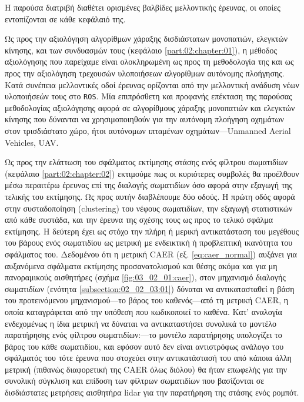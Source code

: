 Η παρούσα διατριβή διαθέτει ορισμένες βαλβίδες μελλοντικής έρευνας, οι οποίες
εντοπίζονται σε κάθε κεφάλαιό της.

Ως προς την αξιολόγηση αλγορίθμων χάραξης δισδιάστατων μονοπατιών, ελεγκτών
κίνησης, και των συνδυασμών τους (κεφάλαιο \ref{part:02:chapter:01}), η μέθοδος
αξιολόγησης που παρείχαμε είναι ολοκληρωμένη ως προς τη μεθοδολογία της και ως
προς την αξιολόγηση τρεχουσών υλοποιήσεων αλγορίθμων αυτόνομης πλοήγησης. Κατά
συνέπεια μελλοντικές οδοί έρευνας ορίζονται από την μελλοντική ανάδυση νέων
υλοποιήσεών τους στο \texttt{ROS}. Μία επιπρόσθετη και προφανής επέκταση της
παρούσας μεθοδολογίας αξιολόγησης αφορά σε αλγορίθμους χάραξης μονοπατιών και
ελεγκτών κίνησης που δύνανται να χρησιμοποιηθούν για την αυτόνομη πλοήγηση
οχημάτων στον τρισδιάστατο χώρο, ήτοι αυτόνομων ιπταμένων οχημάτων---Unmanned
Aerial Vehicles, UAV.

Ως προς την ελάττωση του σφάλματος εκτίμησης στάσης ενός φίλτρου σωματιδίων
(κεφάλαιο \ref{part:02:chapter:02}) εκτιμούμε πως οι κυριότερες συμβολές θα
προέλθουν μέσω περαιτέρω έρευνας επί της διαλογής σωματιδίων όσο αφορά στην
εξαγωγή της τελικής του εκτίμησης. Ως προς αυτήν διαβλέπουμε δύο οδούς. Η πρώτη
οδός αφορά στην συσταδοποίηση (clustering) του νέφους σωματιδίων, την εξαγωγή
στατιστικών από κάθε συστάδα, και την έρευνα της σχέσης τους ως προς το τελικό
σφάλμα εκτίμησης.  Η δεύτερη έχει ως στόχο την πλήρη ή μερική αντικατάσταση του
μεγέθους του βάρους ενός σωματιδίου ως μετρική με ενδεικτική ή προβλεπτική
ικανότητα του σφάλματος του.  Δεδομένου ότι η μετρική CAER (εξ.
\ref{eq:caer_normal}) αυξάνει για αυξανόμενα σφάλματα εκτίμησης προσανατολισμού
και θέσης ακόμα και για μη πανοραμικούς αισθητήρες (σχήμα
\ref{fig:03_02_01:caer}), στον μηχανισμό διαλογής σωματιδίων (ενότητα
\ref{subsection:02_02_03:01}) δύναται να αντικατασταθεί η βάση του
προτεινόμενου μηχανισμού---το βάρος του καθενός---από τη μετρική CAER, η οποία
καταγράφεται από την υπόθεση που κωδικοποιεί το καθένα. Κατ' αναλογία
ενδεχομένως η ίδια μετρική να δύναται να αντικαταστήσει συνολικά το μοντέλο
παρατήρησης ενός φίλτρου σωματιδίων:---το μοντέλο παρατήρησης υπολογίζει το
βάρος του κάθε σωματιδίου, και εφόσον αυτό δεν είναι αντιστρόφως ανάλογο του
σφάλματός του τότε έρευνα που στοχεύει στην αντικατάστασή του από κάποια άλλη
μετρική (πιθανώς διαφορετική της CAER όλως διόλου) θα ήταν επωφελής για την
συνολική σύγκλιση και επίδοση των φίλτρων σωματιδίων που βασίζονται σε
δισδιάστατες μετρήσεις αισθητήρα lidar για την παρατήρηση της στάσης ενός
ρομπότ.

